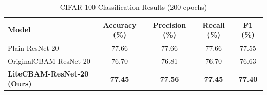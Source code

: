 \begin{table}[ht]
\centering
\caption{CIFAR-100 Classification Results (200 epochs)}
\label{tab:cifar100_results}
\begin{tabular}{lcccc}
\toprule
\textbf{Model} & \textbf{Accuracy (\%)} & \textbf{Precision (\%)} & \textbf{Recall (\%)} & \textbf{F1 (\%)} \\
\midrule
Plain ResNet-20 & 77.66 & 77.66 & 77.66 & 77.55 \\
OriginalCBAM-ResNet-20 & 76.70 & 76.81 & 76.70 & 76.63 \\
\textbf{LiteCBAM-ResNet-20 (Ours)} & \textbf{77.45} & \textbf{77.56} & \textbf{77.45} & \textbf{77.40} \\
\bottomrule
\end{tabular}
\end{table}
